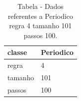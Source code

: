 \begin{table}[H]
\centering
\caption{Tabela - Dados referentes a Periodico regra 4 tamanho 101 passos 100.}
\label{tab:Periodico_regra_4_tamanho_101_passos_100}
\begin{tabular}{ll}
\toprule
classe & Periodico \\
\midrule
regra & 4 \\
tamanho & 101 \\
passos & 100 \\
\bottomrule
\end{tabular}

\end{table}
